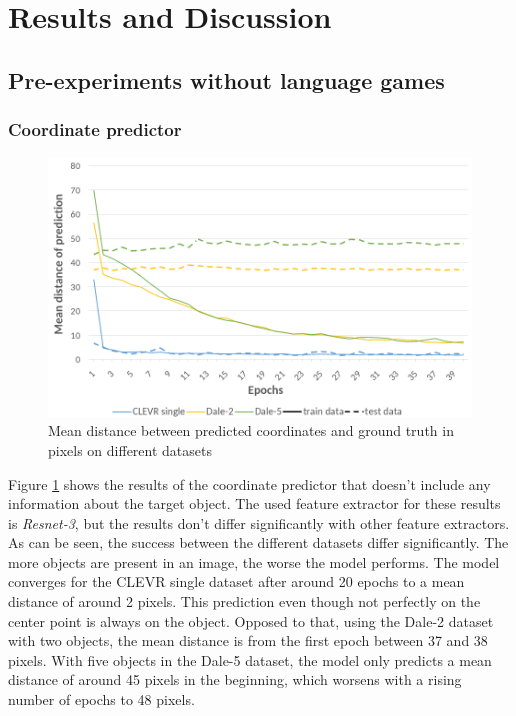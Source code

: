 \section{Results and Discussion}
\label{sec:results}

\subsection{Pre-experiments without language games}
\subsubsection{Coordinate predictor}


\begin{figure}[h]
    \centering
    \includegraphics[width=0.8\linewidth]{figures/coordinate-predictor_loss.png}
    \caption{Mean distance between predicted coordinates and ground truth in pixels on different datasets}
    \label{fig:coordinate-predictor_loss}
\end{figure}

Figure \ref{fig:coordinate-predictor_loss} shows the results of the coordinate predictor that doesn't include any information about the target object.
The used feature extractor for these results is \emph{Resnet-3}, but the results don't differ significantly with other feature extractors.
As can be seen, the success between the different datasets differ significantly.
The more objects are present in an image, the worse the model performs.
The model converges for the CLEVR single dataset after around 20 epochs to a mean distance of around 2 pixels.
This prediction even though not perfectly on the center point is always on the object.
Opposed to that, using the Dale-2 dataset with two objects, the mean distance is from the first epoch between 37 and 38 pixels.
With five objects in the Dale-5 dataset, the model only predicts a mean distance of around 45 pixels in the beginning, which worsens with a rising number of epochs to 48 pixels.

